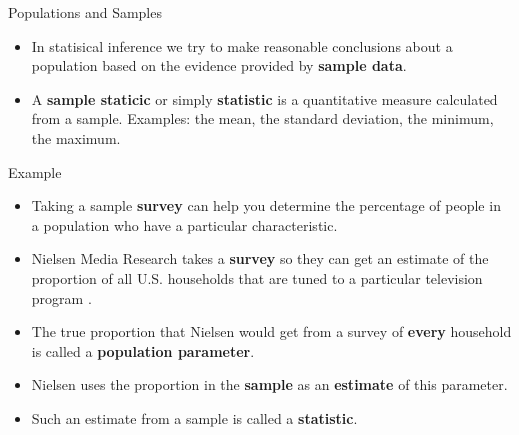 \documentclass[handout]{beamer}
\begin{document}
\begin{frame}{Populations and Samples}
\scriptsize{
\begin{itemize}
 \item In statisical inference we try to make reasonable conclusions about a population based on the evidence provided by \textbf{sample data}.

 
 \item A \textbf{sample staticic} or simply \textbf{statistic} is a quantitative measure calculated from a sample. Examples: the mean, the standard deviation, the minimum, the maximum.
 
 

\end{itemize}

\begin{block}{Example}
\begin{itemize}

\item  Taking a sample \textbf{survey} can help you determine the percentage of people in a population who have a particular characteristic.

 \item Nielsen Media Research takes a \textbf{survey} so they can get an estimate of the proportion of all U.S. households that are tuned to a particular television program  \cite{watkins2010statistics}.
 
\item The true proportion that Nielsen would get from a survey of \textbf{every} household is called a \textbf{population parameter}.

\item Nielsen uses the proportion in the \textbf{sample} as an
\textbf{estimate} of this parameter. 

\item Such an estimate from a sample is called a \textbf{statistic}.
 
\end{itemize}

 
\end{block}


} 
\end{frame}
\end{document}
